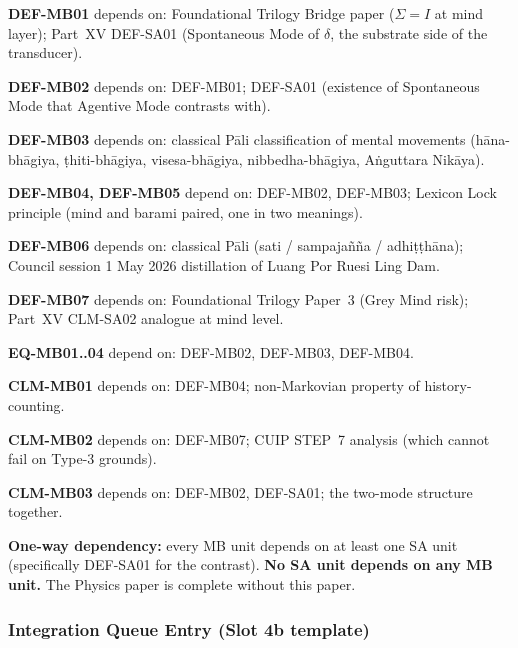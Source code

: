 \documentclass[12pt, a4paper]{article}
\begin{document}
\begin{formalbox}[title={Dependencies of MB atomic units}]
\textbf{DEF-MB01} depends on: Foundational Trilogy Bridge paper
($\Sigma = I$ at mind layer); Part~XV DEF-SA01 (Spontaneous Mode of
$\delta$, the substrate side of the transducer).

\textbf{DEF-MB02} depends on: DEF-MB01; DEF-SA01 (existence of
Spontaneous Mode that Agentive Mode contrasts with).

\textbf{DEF-MB03} depends on: classical Pāli classification of
mental movements (hāna-bhāgiya, ṭhiti-bhāgiya, visesa-bhāgiya,
nibbedha-bhāgiya, Aṅguttara Nikāya).

\textbf{DEF-MB04, DEF-MB05} depend on: DEF-MB02, DEF-MB03; Lexicon
Lock principle (mind and barami paired, one in two meanings).

\textbf{DEF-MB06} depends on: classical Pāli (sati / sampajañña /
adhiṭṭhāna); Council session 1 May 2026 distillation of Luang Por
Ruesi Ling Dam.

\textbf{DEF-MB07} depends on: Foundational Trilogy Paper~3
(Grey Mind risk); Part~XV CLM-SA02 analogue at mind level.

\textbf{EQ-MB01..04} depend on: DEF-MB02, DEF-MB03, DEF-MB04.

\textbf{CLM-MB01} depends on: DEF-MB04; non-Markovian property of
history-counting.

\textbf{CLM-MB02} depends on: DEF-MB07; CUIP STEP~7 analysis (which
cannot fail on Type-3 grounds).

\textbf{CLM-MB03} depends on: DEF-MB02, DEF-SA01; the two-mode
structure together.

\textbf{One-way dependency:} every MB unit depends on at least one
SA unit (specifically DEF-SA01 for the contrast). \textbf{No SA unit
depends on any MB unit.} The Physics paper is complete without this
paper.
\end{formalbox}

\subsubsection{Integration Queue Entry (Slot 4b template)}
\end{document}
